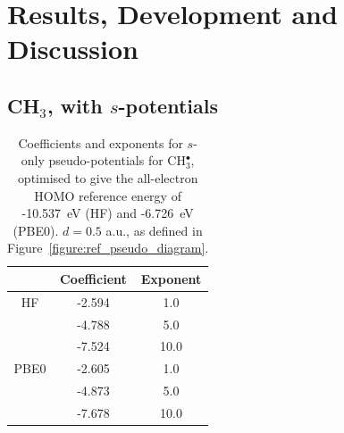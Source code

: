 \documentclass[journal=jctcce,manuscript=article]{achemso}
\begin{document}
\section{Results, Development and Discussion}
\subsection{CH\(_{3}\), with \(s\)-potentials}


\begin{table}[ht]
\caption{Coefficients and exponents for \(s\)-only pseudo-potentials for CH\(^{\bullet}_{3}\), optimised to give 
the all-electron HOMO reference energy of  -10.537~eV (HF) and -6.726~eV (PBE0). 
\(d = 0.5\) a.u., as defined in Figure~\ref{figure:ref_pseudo_diagram}.}
\begin{tabular}{c c c}
\hline
 & Coefficient & Exponent \\ [0.5ex]
\hline
HF & -2.594 & 1.0 \\
 & -4.788 & 5.0 \\
 & -7.524 & 10.0 \\
\hline
PBE0 & -2.605 & 1.0 \\
 & -4.873 & 5.0 \\
 & -7.678 & 10.0 \\
\hline
\end{tabular}
\label{table:ch3_s_potentials}
\end{table}
\end{document}
